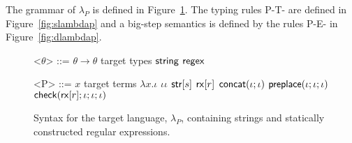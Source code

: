 \documentclass[9pt]{sig-alternate}
\theoremstyle{definition}
\newcommand{\lambdap}{\lambda_P}
\newcommand{\tcheck}[4]{{\sf check}(#1; #2; #3; #4)}
\renewcommand{\tstr}[1]{{{\sf str}[#1]}}
\newcommand{\preplace}[3]{{\sf preplace}(#1;#2;#3)}
\newcommand{\tconcat}[2]{{\sf concat}(#1;#2)} \newcommand{\concat}[2]{{\sf concat}(#1;#2)} %
\newcommand{\rx}[1]{ {\sf rx}[#1] }
\newcommand{\str}{{\sf string}}
\newcommand{\regex}{{\sf regex}}
\begin{document}
The grammar of $\lambdap$ is defined in Figure~\ref{fig:lcsSyntax}.
The typing rules \textsc{P-T-} are defined in Figure~\ref{fig:slambdap}
and a big-step semantics is defined by the rules \textsc{P-E-} in Figure~\ref{fig:dlambdap}.

\renewcommand{\grammarlabel}[2]{#1\hfill#2}

\begin{figure}[h]
\begin{grammar}

<$\theta$> ::= $\theta \rightarrow \theta$ \hfill target types \alt
$\str$ \alt $\regex$


<P> ::= $x$  \hfill target terms \alt
   $\lambda x . \iota$ \alt
   $\iota \iota$ \alt
  $\tstr{s}$ \alt
  $\rx{r}$ \alt
  $\tconcat{\iota}{\iota}$ \alt
  $\preplace{\iota}{\iota}{\iota}$ \alt
  $\tcheck{\rx{r}}{\iota}{\iota}{\iota}$ 
  \end{grammar}
\caption{Syntax for the target language, $\lambdap$, containing strings and statically constructed regular expressions.}
\label{fig:lcsSyntax}
\end{figure}
\end{document}
